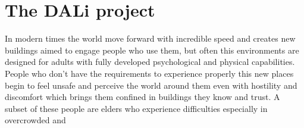 \chapter{The DALi project}

In modern times the world move forward with incredible speed and creates new buildings aimed to engage people who use them, but often this environments are designed for adults with fully developed psychological and physical capabilities.
People who don't have the requirements to experience properly this new places begin to feel unsafe and perceive the world around them even with hostility and discomfort which brings them confined in buildings they know and trust.
A subset of these people are elders who experience difficulties especially in overcrowded and 


